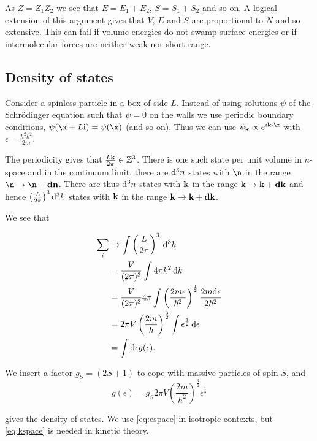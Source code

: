 \documentclass{notes}
\renewcommand{\k}{\vect{k}}
\begin{document}
As $Z = Z_1 Z_2$ we see that $E = E_1 + E_2$, $S = S_1 + S_2$ and so on.
A logical extension of this argument gives that $V$, $E$ and $S$ are
proportional to $N$ and so extensive.  This can fail if volume energies do
not swamp surface energies or if intermolecular forces are neither weak
nor short range.

\subsection{Density of states}\label{sec:states}

Consider a spinless particle in a box of side $L$.  Instead of
using solutions $\psi$ of the Schr\"odinger equation such that
$\psi = 0$ on the walls we use periodic boundary conditions,
$\psi(\x + L \vect{i}) = \psi(\x)$ (and so on).  Thus we can
use $\psi_\k \propto e^{\imath \k \cdot \x}$ with
$\epsilon = \frac{\hbar^2 k^2}{2 m}$.

The periodicity gives that $\frac{L \k}{2 \pi} \in \Z^3$.  There is
one such state per unit volume in $n$-space and in the continuum
limit, there are $\mathrm{d}^3 n$ states with $\n$ in the range
$\n \to \n+\vect{dn}$.  There are thus $\mathrm{d}^3 n$ states
with $\mathbf{k}$ in the range $\mathbf{k} \to \mathbf{k}+\mathbf{dk}$ and
hence $\left(\tfrac{L}{2 \pi} \right)^3 \mathrm{d}^3 k$ states with
$\mathbf{k}$ in the range $\mathbf{k} \to \mathbf{k}+\mathbf{dk}$.

We see that

\begin{align}
\sum_i &\to \int \left( \frac{L}{2 \pi} \right)^3\, \mathrm{d}^3 k
\label{eq:kspace}\\
&= \frac{V}{(2 \pi)^3} \int 4 \pi k^2\, \mathrm{d} k \notag \\
&= \frac{V}{(2 \pi)^3} 4 \pi \int \left( \frac{2 m \epsilon}{\hbar^2}
\right)^{\frac{1}{2}} \frac{2 m \mathrm{d} \epsilon}{2 \hbar^2}\notag \\
&= 2 \pi V \left(\frac{2 m}{h}\right)^{\frac{3}{2}} \int \epsilon^{\frac{1}{2}}
\, \mathrm{d} \epsilon \label{eq:espace} \\
&= \int \mathrm{d} \epsilon g(\epsilon). \notag
\end{align}

We insert a factor $g_S = (2 S + 1)$ to cope with massive particles of
spin $S$, and
\[
g(\epsilon) = g_S 2 \pi V \left( \frac{2 m}{h^2} \right)^{\frac{3}{2}}
\epsilon^{\frac{1}{2}}
\]

gives the density of states.  We use \eqref{eq:espace}
in isotropic contexts, but \eqref{eq:kspace} is needed in kinetic theory.
\end{document}

